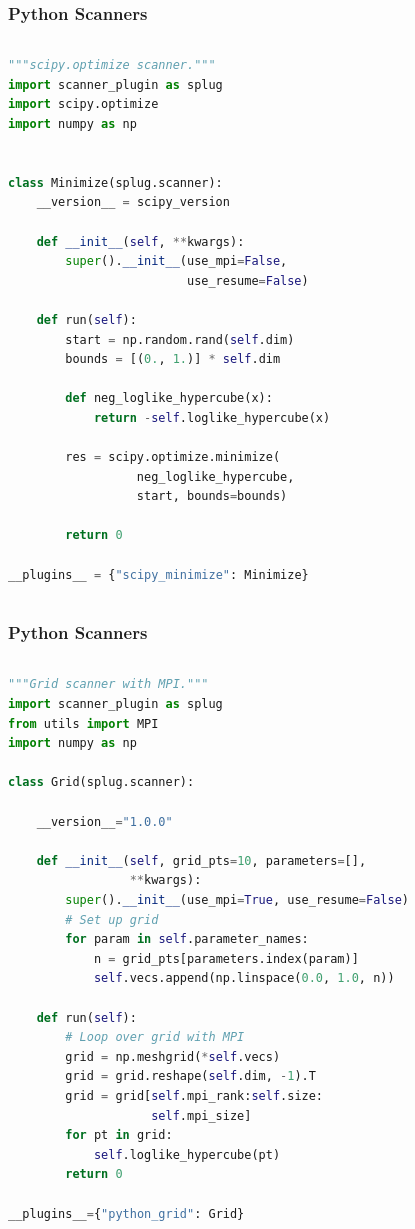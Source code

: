 \documentclass[aspectratio=169]{beamer}
\begin{document}
\begin{frame}[fragile]
    \frametitle{Python Scanners}
    \begin{columns}
        
\begin{lstlisting}[language=Python]
"""scipy.optimize scanner."""
import scanner_plugin as splug
import scipy.optimize
import numpy as np


class Minimize(splug.scanner):
    __version__ = scipy_version

    def __init__(self, **kwargs):
        super().__init__(use_mpi=False,
                         use_resume=False)

    def run(self):
        start = np.random.rand(self.dim)
        bounds = [(0., 1.)] * self.dim

        def neg_loglike_hypercube(x):
            return -self.loglike_hypercube(x)

        res = scipy.optimize.minimize(
                  neg_loglike_hypercube,
                  start, bounds=bounds)

        return 0

__plugins__ = {"scipy_minimize": Minimize}
\end{lstlisting}
    \end{columns}
\end{frame}


\begin{frame}[fragile]
    \frametitle{Python Scanners}
    \begin{columns}
        
\begin{lstlisting}[language=Python]
"""Grid scanner with MPI."""
import scanner_plugin as splug
from utils import MPI
import numpy as np

class Grid(splug.scanner):

    __version__="1.0.0"

    def __init__(self, grid_pts=10, parameters=[],
                 **kwargs):
        super().__init__(use_mpi=True, use_resume=False)
        # Set up grid
        for param in self.parameter_names:
            n = grid_pts[parameters.index(param)]
            self.vecs.append(np.linspace(0.0, 1.0, n))
    
    def run(self):
        # Loop over grid with MPI
        grid = np.meshgrid(*self.vecs)
        grid = grid.reshape(self.dim, -1).T
        grid = grid[self.mpi_rank:self.size:
                    self.mpi_size]
        for pt in grid:
            self.loglike_hypercube(pt)
        return 0

__plugins__={"python_grid": Grid}
\end{lstlisting}
    \end{columns}
\end{frame}
\end{document}
